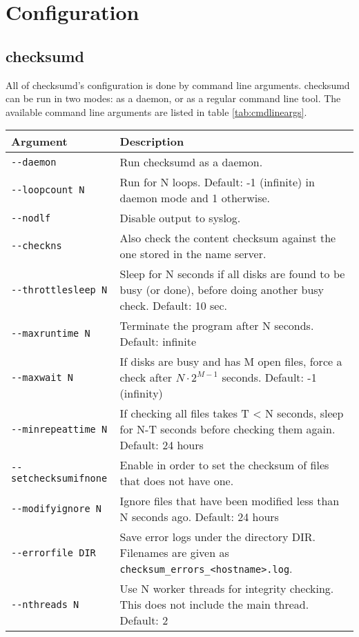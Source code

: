 \section{Configuration}

\subsection{checksumd}
All of checksumd's configuration is done by command line arguments. checksumd can be run in two modes: as a daemon, or as a regular command line tool. The available command line arguments are listed in table \ref{tab:cmdlineargs}.

\begin{table}[ht]
\begin{tabular}{lp{10cm}}
\hline
{\bf Argument}              & {\bf Description}\\
\hline
{\tt -{}-daemon}              & Run checksumd as a daemon.\\
{\tt -{}-loopcount N}         & Run for N loops. Default: -1 (infinite) in daemon mode and 1 otherwise.\\
{\tt -{}-nodlf}               & Disable output to syslog.\\
{\tt -{}-checkns}             & Also check the content checksum against the one stored in the name server.\\
{\tt -{}-throttlesleep N}     & Sleep for N seconds if all disks are found to be busy (or done), before doing another busy check. Default: 10 sec.\\
{\tt -{}-maxruntime N}        & Terminate the program after N seconds. Default: infinite\\
{\tt -{}-maxwait N}           & If disks are busy and has M open files, force a check after $N\cdot 2^{M-1}$ seconds. Default: -1 (infinity)\\
{\tt -{}-minrepeattime N}     & If checking all files takes T < N seconds, sleep for N-T seconds before checking them again. Default: 24 hours\\
{\tt -{}-setchecksumifnone}   & Enable in order to set the checksum of files that does not have one.\\
{\tt -{}-modifyignore N}      & Ignore files that have been modified less than N seconds ago. Default: 24 hours\\
{\tt -{}-errorfile DIR}       & Save error logs under the directory DIR. Filenames are given as {\tt checksum\_errors\_<hostname>.log}.\\
{\tt -{}-nthreads N}          & Use N worker threads for integrity checking. This does not include the main thread. Default: 2\\

\end{tabular}
\end{table}
